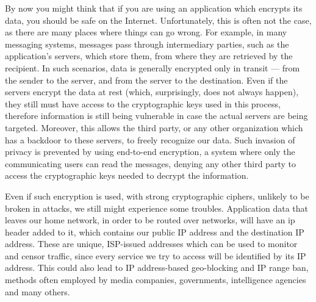 \documentclass[a4paper,12pt]{report}
\begin{document}
		By now you might think that if you are using an application which encrypts its data, you should be safe on the Internet. Unfortunately, this is often not the case, as there are many places where things can go wrong. For example, in many messaging systems, messages pass through intermediary parties, such as the application's servers, which store them, from where they are retrieved by the recipient. In such scenarios, data is generally encrypted only in transit --- from the sender to the server, and from the server to the destination. Even if the servers encrypt the data at rest (which, surprisingly, does not always happen), they still must have access to the cryptographic keys used in this process, therefore information is still being vulnerable in case the actual servers are being targeted. Moreover, this allows the third party, or any other organization which has a backdoor to these servers, to freely recognize our data. Such invasion of privacy is prevented by using end-to-end encryption, a system where only the communicating users can read the messages, denying any other third party to access the cryptographic keys needed to decrypt the information.
		
		Even if such encryption is used, with strong cryptographic ciphers, unlikely to be broken in attacks, we still might experience some troubles. Application data that leaves our home network, in order to be routed over networks, will have an \acrfull{ip} header added to it, which contains our public IP address and the destination IP address. These are unique, ISP-issued addresses which can be used to monitor and censor traffic, since every service we try to access will be identified by its IP address. This could also lead to IP address-based geo-blocking and IP range ban, methods often employed by media companies, governments, intelligence agencies and many others.
		
\end{document}
